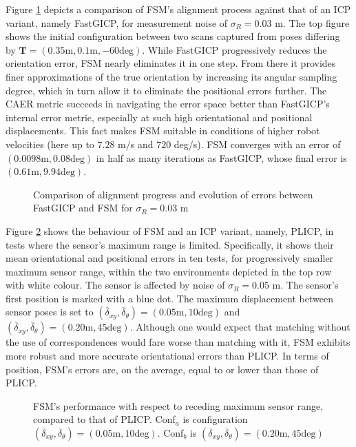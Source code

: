 Figure \ref{fig:char_fsm_vs_FGI} depicts a comparison of FSM's alignment
process against that of an ICP variant, namely FastGICP, for measurement noise
of $\sigma_R = 0.03$ m. The top figure shows the initial configuration
between two scans captured from poses differing by $\bm{T} = (0.35 \text{m},
0.1 \text{m}, -60 \text{deg})$. While FastGICP progressively reduces the
orientation error, FSM nearly eliminates it in one step. From there it provides
finer approximations of the true orientation by increasing its angular sampling
degree, which in turn allow it to eliminate the positional errors further. The
CAER metric succeeds in navigating the error space better than FastGICP's
internal error metric, especially at such high orientational and positional
displacements. This fact makes FSM suitable in conditions of higher robot
velocities (here up to $7.28$ m/s and $720$ deg/s). FSM converges with an error
of $(0.0098 \text{m}, 0.08 \text{deg})$ in half as many iterations as FastGICP,
whose final error is $(0.61 \text{m}, 9.94 \text{deg})$.

\begin{figure}
    \vspace{0.3cm}
    
    \caption{\small Comparison of alignment progress and evolution of errors
             between FastGICP and FSM for $\sigma_R = 0.03$ m}%
    \label{fig:char_fsm_vs_FGI}%
\end{figure}

Figure \ref{fig:char_max_range_test} shows the behaviour of FSM and an ICP
variant, namely, PLICP, in tests where the sensor's maximum range is limited.
Specifically, it shows their mean orientational and positional errors in ten
tests, for progressively smaller maximum sensor range, within the two
environments depicted in the top row with white colour. The sensor is affected
by noise of $\sigma_R = 0.05$ m. The sensor's first position is marked with a
blue dot. The maximum displacement between sensor poses is set to
$(\overline{\delta}_{xy}, \overline{\delta}_{\theta}) = (0.05 \text{m}, 10 \text{deg})$
and
$(\overline{\delta}_{xy}, \overline{\delta}_{\theta}) = (0.20 \text{m}, 45 \text{deg})$.
Although one would expect that matching without the use of correspondences would
fare worse than matching with it, FSM exhibits more robust and more accurate
orientational errors than PLICP. In terms of position, FSM's errors are, on
the average, equal to or lower than those of PLICP.


\begin{figure}\centering
\vspace{-0.2cm}
    
    \vspace{-1.5cm}
    \caption{\small FSM's performance with respect to receding maximum sensor
             range, compared to that of PLICP. Conf$_a$ is configuration
             $(\overline{\delta}_{xy}, \overline{\delta}_{\theta}) = (0.05 \text{m}, 10 \text{deg})$.
             Conf$_b$ is
             $(\overline{\delta}_{xy}, \overline{\delta}_{\theta}) = (0.20 \text{m}, 45 \text{deg})$
             }%
    \label{fig:char_max_range_test}%
\end{figure}
